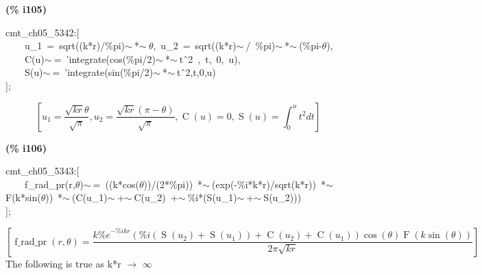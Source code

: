\documentclass[fleqn]{article}
\begin{document}
\noindent
\begin{minipage}[t]{4.000000em}\color{red}\bfseries
(\% i105)	
\end{minipage}
\begin{minipage}[t]{\textwidth}\color{blue}
cmt\_ch05\_5342:[\\
\ \ \ \ u\_1\ =\ sqrt((k*r)/\%pi)\ensuremath{\sim\ }*\ensuremath{\sim\ }\ensuremath{\theta},\ u\_2\ =\ sqrt((k*r)\ensuremath{\sim\ }/\ \%pi)\ensuremath{\sim\ }*\ensuremath{\sim\ }(\%pi-\ensuremath{\theta}),\\
\ \ \ \ C(u)\ensuremath{\sim\ }=\ 'integrate(cos(\%pi/2)\ensuremath{\sim\ }*\ensuremath{\sim\ }t\^\ 2\ ,\ t,\ 0,\ u),\\
\ \ \ \ S(u)\ensuremath{\sim\ }=\ 'integrate(sin(\%pi/2)\ensuremath{\sim\ }*\ensuremath{\sim\ }t\^\ 2,t,0,u)\\
];
\end{minipage}
\[\displaystyle \tag{\% o105} 
\left[ {u_1}=\frac{\sqrt{k r} \theta }{\sqrt{\ensuremath{\pi} }}\operatorname{,}{u_2}=\frac{\sqrt{k r} \left( \ensuremath{\pi} -\theta \right) }{\sqrt{\ensuremath{\pi} }}\operatorname{,}\operatorname{C}(u)=0\operatorname{,}\operatorname{S}(u)=\int_{0}^{u}{\left. {{t}^{2}}dt\right.}\right] \mbox{}
\]


\noindent
\begin{minipage}[t]{4.000000em}\color{red}\bfseries
(\% i106)	
\end{minipage}
\begin{minipage}[t]{\textwidth}\color{blue}
cmt\_ch05\_5343:[\\
\ \ \ \ f\_rad\_pr(r,\ensuremath{\theta})\ensuremath{\sim\ }=\ ((k*cos(\ensuremath{\theta}))/(2*\%pi))\ *\ensuremath{\sim\ }(exp(-\%i*k*r)/sqrt(k*r))\ *\ensuremath{\sim\ }F(k*sin(\ensuremath{\theta}))\ *\ensuremath{\sim\ }(C(u\_1)\ensuremath{\sim\ }+\ensuremath{\sim\ }C(u\_2)\ +\ensuremath{\sim\ }\%i*(S(u\_1)\ensuremath{\sim\ }+\ensuremath{\sim\ }S(u\_2)))\\
];
\end{minipage}
\[\displaystyle \tag{\% o106} 
\operatorname{[}\operatorname{f\_ rad\_ pr}\left( r\operatorname{,}\theta \right) =\frac{k {{\% e}^{-\% i k r}} \left( \% i \left( \operatorname{S}\left( {u_2}\right) +\operatorname{S}\left( {u_1}\right) \right) +\operatorname{C}\left( {u_2}\right) +\operatorname{C}\left( {u_1}\right) \right)  \cos{\left( \theta \right) } \operatorname{F}\left( k \sin{\left( \theta \right) }\right) }{2 \ensuremath{\pi}  \sqrt{k r}}\operatorname{]}\mbox{}
\]
The following is true as k*r \ensuremath{\longrightarrow} \ensuremath{\infty}
\end{document}
